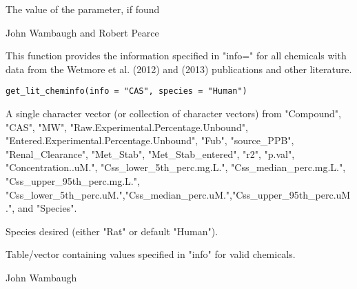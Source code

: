 \documentclass[a4paper]{book}
\begin{document}
%
\begin{Value}
The value of the parameter, if found
\end{Value}
%
\begin{Author}\relax
John Wambaugh and Robert Pearce
\end{Author}
%
\begin{Description}\relax
This function provides the information specified in "info=" for all
chemicals with data from the Wetmore et al. (2012) and (2013) publications
and other literature.
\end{Description}
%
\begin{Usage}
\begin{verbatim}
get_lit_cheminfo(info = "CAS", species = "Human")
\end{verbatim}
\end{Usage}
%
\begin{Arguments}
\begin{ldescription}
\item[\code{info}] A single character vector (or collection of character vectors)
from
"Compound", "CAS", "MW", "Raw.Experimental.Percentage.Unbound",
"Entered.Experimental.Percentage.Unbound", "Fub", "source\_PPB",
"Renal\_Clearance", "Met\_Stab", "Met\_Stab\_entered",
"r2", "p.val", "Concentration..uM.", "Css\_lower\_5th\_perc.mg.L.", 
"Css\_median\_perc.mg.L.", "Css\_upper\_95th\_perc.mg.L.",
"Css\_lower\_5th\_perc.uM.","Css\_median\_perc.uM.","Css\_upper\_95th\_perc.uM.",
and "Species".

\item[\code{species}] Species desired (either "Rat" or default "Human").
\end{ldescription}
\end{Arguments}
%
\begin{Value}
\begin{ldescription}
\item[\code{info}] Table/vector containing values specified in "info" for
valid chemicals.
\end{ldescription}
\end{Value}
%
\begin{Author}\relax
John Wambaugh
\end{Author}
%
\end{document}
